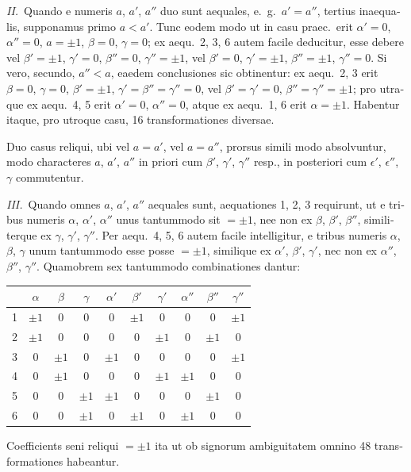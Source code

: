 \documentclass[12pt,a4paper]{article}
\theoremstyle{plain}
\theoremstyle{definition}
\theoremstyle{remark}
\begin{document}
\begin{otherlanguage}{latin}
\textit{II.}\ Quando e numeris $a$, $a'$, $a''$ duo sunt aequales, e.\ g.\ $a' = a''$, tertius inaequalis, supponamus primo $a < a'$. Tunc eodem modo ut in casu praec.\ erit $\alpha' = 0$, $\alpha'' = 0$, $a = \pm 1$, $\beta = 0$, $\gamma = 0$; ex aequ.\ 2, 3, 6 autem facile deducitur, esse debere vel $\beta' = \pm 1$, $\gamma' = 0$, $\beta'' = 0$, $\gamma'' = \pm 1$, vel $\beta' = 0$, $\gamma' = \pm 1$, $\beta'' = \pm 1$, $\gamma'' = 0$. Si vero, secundo, $a'' < a$, eaedem conclusiones sic obtinentur: ex aequ.\ 2, 3 erit $\beta = 0$, $\gamma = 0$, $\beta' = \pm 1$, $\gamma' = \beta'' = \gamma'' = 0$, vel $\beta' = \gamma' = 0$, $\beta'' = \gamma'' = \pm 1$; pro utraque ex aequ.\ 4, 5 erit $\alpha' = 0$, $\alpha'' = 0$, atque ex aequ.\ 1, 6 erit $\alpha = \pm 1$. Habentur itaque, pro utroque casu, 16 transformationes diversae.

Duo casus reliqui, ubi vel $a = a'$, vel $a = a''$, prorsus simili modo absolvuntur, modo characteres $a$, $a'$, $a''$ in priori cum $\beta'$, $\gamma'$, $\gamma''$ resp., in posteriori cum $\epsilon'$, $\epsilon''$, $\gamma$ commutentur.

\textit{III.}\ Quando omnes $a$, $a'$, $a''$ aequales sunt, aequationes 1, 2, 3 requirunt, ut e tribus numeris $\alpha$, $\alpha'$, $\alpha''$ unus tantummodo sit $= \pm 1$, nee non ex $\beta$, $\beta'$, $\beta''$, similiterque ex $\gamma$, $\gamma'$, $\gamma''$. Per aequ.\ 4, 5, 6 autem facile intelligitur, e tribus numeris $\alpha$, $\beta$, $\gamma$ unum tantummodo esse posse $= \pm 1$, similique ex $\alpha'$, $\beta'$, $\gamma'$, nec non ex $\alpha''$, $\beta''$, $\gamma''$. Quamobrem sex tantummodo combinationes dantur:
\begin{center}
\begin{tabular}{c|ccc|ccc|ccc}
& $\alpha$ & $\beta$ & $\gamma$ & $\alpha'$ & $\beta'$ & $\gamma'$ & $\alpha''$ & $\beta''$ & $\gamma''$ \\
\hline
1 & $\pm 1$ & 0 & 0 & 0 & $\pm 1$ & 0 & 0 & 0 & $\pm 1$ \\
2 & $\pm 1$ & 0 & 0 & 0 & 0 & $\pm 1$ & 0 & $\pm 1$ & 0 \\
3 & 0 & $\pm 1$ & 0 & $\pm 1$ & 0 & 0 & 0 & 0 & $\pm 1$ \\
4 & 0 & $\pm 1$ & 0 & 0 & 0 & $\pm 1$ & $\pm 1$ & 0 & 0 \\
5 & 0 & 0 & $\pm 1$ & $\pm 1$ & 0 & 0 & 0 & $\pm 1$ & 0 \\
6 & 0 & 0 & $\pm 1$ & 0 & $\pm 1$ & 0 & $\pm 1$ & 0 & 0
\end{tabular}
\end{center}
Coefficients seni reliqui $= \pm 1$ ita ut ob signorum ambiguitatem omnino 48 transformationes habeantur.


\end{otherlanguage}
\end{document}
